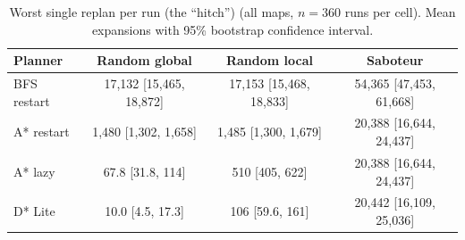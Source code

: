 \begin{table}[!t]
\centering
\footnotesize
\caption{Worst single replan per run (the ``hitch'') (all maps, $n=360$ runs per cell). Mean expansions with 95\% bootstrap confidence interval.}
\label{tab:hitch}
\begin{tabular}{lccc}
\toprule
Planner & Random global & Random local & Saboteur \\
\midrule
BFS restart & 17,132 [15,465, 18,872] & 17,153 [15,468, 18,833] & 54,365 [47,453, 61,668] \\
A* restart & 1,480 [1,302, 1,658] & 1,485 [1,300, 1,679] & 20,388 [16,644, 24,437] \\
A* lazy & 67.8 [31.8, 114] & 510 [405, 622] & 20,388 [16,644, 24,437] \\
D* Lite & 10.0 [4.5, 17.3] & 106 [59.6, 161] & 20,442 [16,109, 25,036] \\
\bottomrule
\end{tabular}
\end{table}

